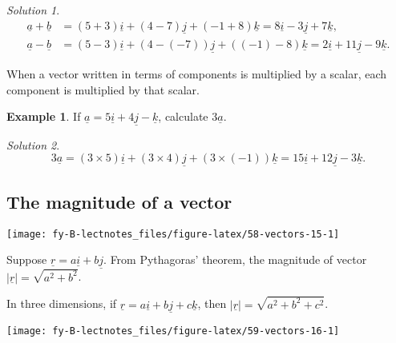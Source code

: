 \documentclass[
  english,
  11pt,
  oneside]{book}
\newcommand{\slide}{}
\theoremstyle{definition}
\theoremstyle{definition}
\newtheorem{example}{Example}[chapter]
\theoremstyle{definition}
\theoremstyle{definition}
\theoremstyle{remark}
\newtheorem*{solution}{Solution}
\begin{document}
\begin{solution}
\begin{align*}
\underline a + \underline b &= (5+3)\underline i + (4 - 7)\underline j + (-1 + 8)\underline k = 8\underline i -3\underline j + 7\underline k,\\
\underline a - \underline b &= (5 - 3)\underline i + (4 - (-7))\underline j + ((-1) - 8)\underline k = 2\underline i + 11\underline j -9\underline k.
\end{align*}
\end{solution}

\slide

When a vector written in terms of components is multiplied by a scalar, each component is multiplied by that scalar.

\begin{example}
If \(\underline a = 5\underline i + 4\underline j - \underline k\), calculate \(3\underline{a}\).
\end{example}

\begin{solution}
\[
3\underline a = (3\times 5)\underline{i} + (3\times 4)\underline{j} + (3\times(-1))\underline{k} = 15\underline i + 12\underline j - 3\underline k.
\]
\end{solution}

\slide

\subsection{The magnitude of a vector}\label{the-magnitude-of-a-vector}

\begin{center}\texttt{[image: fy-B-lectnotes\_files/figure-latex/58-vectors-15-1]} \end{center}

Suppose \(\underline r = a\underline i + b\underline j\). From Pythagoras' theorem, the magnitude of vector \(|\underline r| = \sqrt{a^2+b^2}\).

\slide

In three dimensions, if \(\underline r = a\underline i + b\underline j + c\underline k\), then \(|\underline r| = \sqrt{a^2+b^2+c^2}\).

\begin{center}\texttt{[image: fy-B-lectnotes\_files/figure-latex/59-vectors-16-1]} \end{center}

\slide
\end{document}
